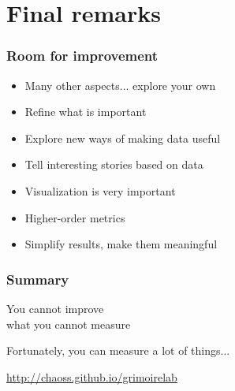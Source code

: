 \documentclass[17pt,aspectratio=169,hyperref=pdfusetitle]{beamer}
\begin{document}
\section{Final remarks}


\begin{frame}
\frametitle{Room for improvement}

  \begin{itemize}
    \item Many other aspects... explore your own
    \item Refine what is important
    \item Explore new ways of making data useful
    \item Tell interesting stories based on data
    \item Visualization is very important
    \item Higher-order metrics
    \item Simplify results, make them meaningful
\end{itemize}

\end{frame}


\begin{frame}
\frametitle{Summary}

\begin{center}
  You cannot improve \\
    what you cannot measure \\
\end{center}

\vspace{.2cm}
\begin{flushright}
  Fortunately, you can measure a lot of things...
  \vspace{.5cm}
  
  \url{http://chaoss.github.io/grimoirelab} \\
\end{flushright}

\end{frame}



\end{document}
